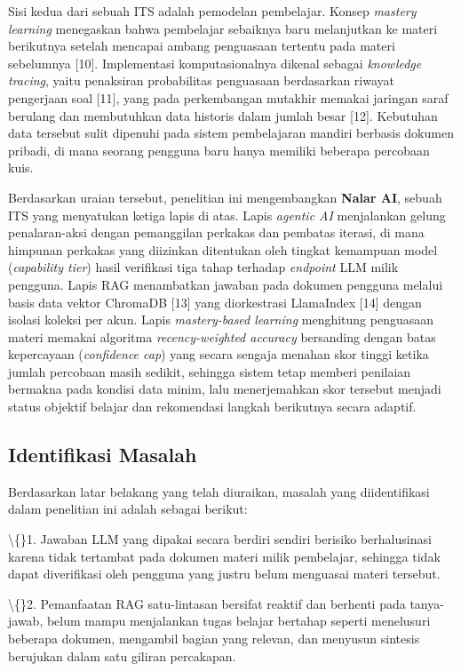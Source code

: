 \documentclass[12pt,a4paper]{article}
\begin{document}
Sisi kedua dari sebuah ITS adalah pemodelan pembelajar. Konsep \textit{mastery learning} menegaskan bahwa pembelajar sebaiknya baru melanjutkan ke materi berikutnya setelah mencapai ambang penguasaan tertentu pada materi sebelumnya {[}10{]}. Implementasi komputasionalnya dikenal sebagai \textit{knowledge tracing}, yaitu penaksiran probabilitas penguasaan berdasarkan riwayat pengerjaan soal {[}11{]}, yang pada perkembangan mutakhir memakai jaringan saraf berulang dan membutuhkan data historis dalam jumlah besar {[}12{]}. Kebutuhan data tersebut sulit dipenuhi pada sistem pembelajaran mandiri berbasis dokumen pribadi, di mana seorang pengguna baru hanya memiliki beberapa percobaan kuis.

Berdasarkan uraian tersebut, penelitian ini mengembangkan \textbf{Nalar AI}, sebuah ITS yang menyatukan ketiga lapis di atas. Lapis \textit{agentic AI} menjalankan gelung penalaran-aksi dengan pemanggilan perkakas dan pembatas iterasi, di mana himpunan perkakas yang diizinkan ditentukan oleh tingkat kemampuan model (\textit{capability tier}) hasil verifikasi tiga tahap terhadap \textit{endpoint} LLM milik pengguna. Lapis RAG menambatkan jawaban pada dokumen pengguna melalui basis data vektor ChromaDB {[}13{]} yang diorkestrasi LlamaIndex {[}14{]} dengan isolasi koleksi per akun. Lapis \textit{mastery-based learning} menghitung penguasaan materi memakai algoritma \textit{recency-weighted accuracy} bersanding dengan batas kepercayaan (\textit{confidence cap}) yang secara sengaja menahan skor tinggi ketika jumlah percobaan masih sedikit, sehingga sistem tetap memberi penilaian bermakna pada kondisi data minim, lalu menerjemahkan skor tersebut menjadi status objektif belajar dan rekomendasi langkah berikutnya secara adaptif.

\subsection*{Identifikasi Masalah}
Berdasarkan latar belakang yang telah diuraikan, masalah yang diidentifikasi dalam penelitian ini adalah sebagai berikut:

\textbackslash\{\}1. Jawaban LLM yang dipakai secara berdiri sendiri berisiko berhalusinasi karena tidak tertambat pada dokumen materi milik pembelajar, sehingga tidak dapat diverifikasi oleh pengguna yang justru belum menguasai materi tersebut.

\textbackslash\{\}2. Pemanfaatan RAG satu-lintasan bersifat reaktif dan berhenti pada tanya-jawab, belum mampu menjalankan tugas belajar bertahap seperti menelusuri beberapa dokumen, mengambil bagian yang relevan, dan menyusun sintesis berujukan dalam satu giliran percakapan.
\end{document}
